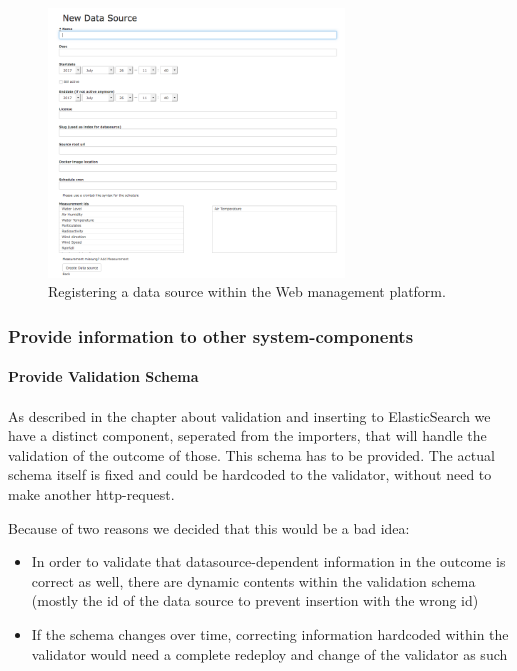 \begin{figure}
	\begin{center}
		\includegraphics[width=0.7\textwidth]{08_web_mgmt/images/new_datasource.png}
		\caption{Registering a data source within the Web management platform.}
		\label{image_new_source}
	\end{center}
\end{figure}

\subsubsection{Provide information to other system-components}

\paragraph{Provide Validation Schema}\label{provide-validation-schema}

\paragraph{}
As described in the chapter about validation and inserting to
ElasticSearch we have a distinct component, seperated from the
importers, that will handle the validation of the outcome of those. This
schema has to be provided. The actual schema itself is fixed and could
be hardcoded to the validator, without need to make another
http-request.

Because of two reasons we decided that this would be a bad idea:

\begin{itemize}
	\item
	In order to validate that datasource-dependent information in the
	outcome is correct as well, there are dynamic contents within the
	validation schema (mostly the id of the data source to prevent
	insertion with the wrong id)
	\item
	If the schema changes over time, correcting information hardcoded
	within the validator would need a complete redeploy and change of the
	validator as such
\end{itemize}

